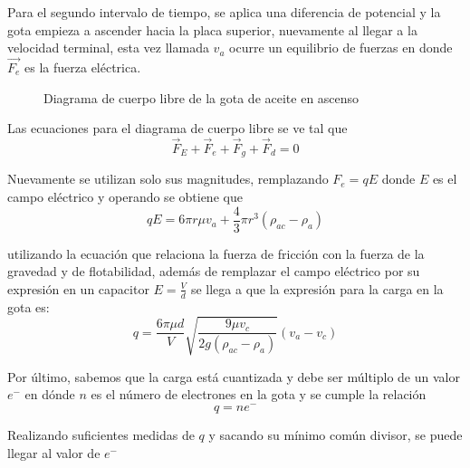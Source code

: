 Para el segundo intervalo de tiempo, se aplica una diferencia de potencial y la
gota empieza a ascender hacia la placa superior, nuevamente al llegar a la
velocidad terminal, esta vez llamada $v_a$ ocurre un equilibrio de fuerzas en
donde $\vec{F_e}$ es la fuerza eléctrica.
\begin{figure}
    \centering
    \caption{Diagrama de cuerpo libre de la gota de aceite en ascenso}
    \label{fig:fbd-ascending-drop}
\end{figure}

Las ecuaciones para el diagrama de cuerpo libre se ve tal que
\begin{equation}
    \vec{F}_E + \vec{F}_e + \vec{F}_g + \vec{F}_d = 0
\end{equation}

Nuevamente se utilizan solo sus magnitudes, remplazando $F_e=qE$ donde $E$ es
el campo eléctrico y operando se obtiene que
\begin{equation}
    qE = 6\pi r\mu v_a + \frac{4}{3}\pi r^3(\rho_{ac}-\rho_a)
\end{equation}

utilizando la ecuación que relaciona la fuerza de fricción con la fuerza de la
gravedad y de flotabilidad, además de remplazar el campo eléctrico por su
expresión en un capacitor $E=\frac{V}{d}$ se llega a que la expresión para la
carga en la gota es:
\begin{equation}\label{eq:charge}
    q = \frac{6\pi \mu d}{V}\sqrt{\frac{9\mu v_c}{2g(\rho_{ac}-\rho_a)}}(v_a-v_c)
\end{equation}

Por último, sabemos que la carga está cuantizada y debe ser múltiplo de un
valor $e^-$ en dónde $n$ es el número de electrones en la gota y se cumple la
relación
\begin{equation}
    q=ne^-
\end{equation}

Realizando suficientes medidas de $q$ y sacando su mínimo común divisor,
se puede llegar al valor de $e^-$
